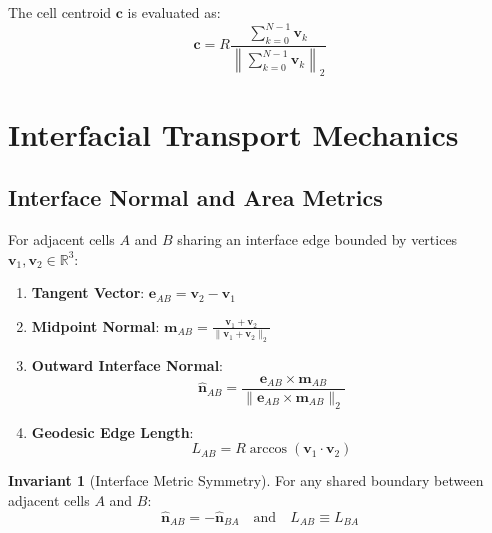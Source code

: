 \documentclass[10pt,twocolumn]{article}
\theoremstyle{definition}
\newtheorem{invariant}{Invariant}
\begin{document}
The cell centroid $\mathbf{c}$ is evaluated as:
\begin{equation}
\mathbf{c} = R \frac{\sum_{k=0}^{N-1} \mathbf{v}_k}{\left\| \sum_{k=0}^{N-1} \mathbf{v}_k \right\|_2}
\end{equation}

\section{Interfacial Transport Mechanics}

\subsection{Interface Normal and Area Metrics}
For adjacent cells $A$ and $B$ sharing an interface edge bounded by vertices $\mathbf{v}_1, \mathbf{v}_2 \in \mathbb{R}^3$:
\begin{enumerate}
    \item \textbf{Tangent Vector}: $\mathbf{e}_{AB} = \mathbf{v}_2 - \mathbf{v}_1$
    \item \textbf{Midpoint Normal}: $\mathbf{m}_{AB} = \frac{\mathbf{v}_1 + \mathbf{v}_2}{\|\mathbf{v}_1 + \mathbf{v}_2\|_2}$
    \item \textbf{Outward Interface Normal}:
    \begin{equation}
    \hat{\mathbf{n}}_{AB} = \frac{\mathbf{e}_{AB} \times \mathbf{m}_{AB}}{\|\mathbf{e}_{AB} \times \mathbf{m}_{AB}\|_2}
    \end{equation}
    \item \textbf{Geodesic Edge Length}:
    \begin{equation}
    L_{AB} = R \arccos(\mathbf{v}_1 \cdot \mathbf{v}_2)
    \end{equation}
\end{enumerate}

\begin{invariant}[Interface Metric Symmetry]
For any shared boundary between adjacent cells $A$ and $B$:
\begin{equation}
\hat{\mathbf{n}}_{AB} = -\hat{\mathbf{n}}_{BA} \quad \text{and} \quad L_{AB} \equiv L_{BA}
\end{equation}
\end{invariant}
\end{document}
